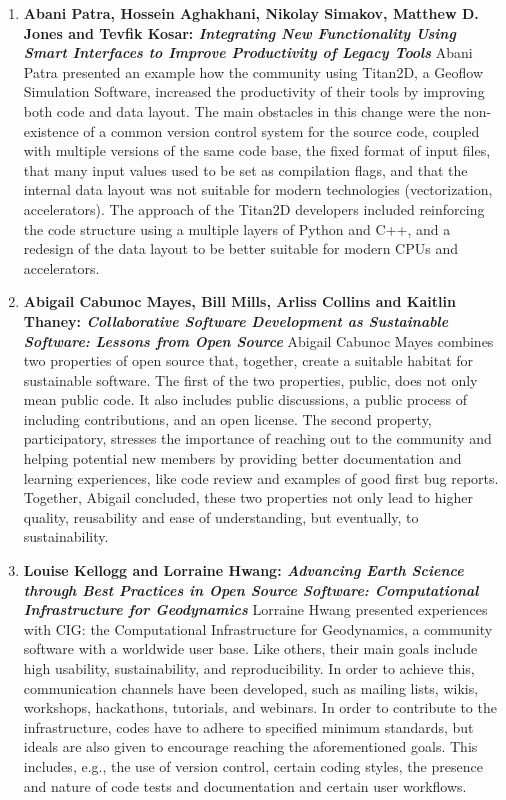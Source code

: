\documentclass[11pt, oneside]{amsart}
\begin{document}
\begin{enumerate}
\item \textbf{Abani Patra, Hossein Aghakhani, Nikolay Simakov, Matthew D. Jones
and Tevfik Kosar: \textit{Integrating New Functionality Using Smart Interfaces
to Improve Productivity of Legacy Tools}} Abani Patra presented an example how
the community using Titan2D, a Geoflow Simulation Software, increased the
productivity of their tools by improving both code and data layout. The main
obstacles in this change were the non-existence of a common version control
system for the source code, coupled with multiple versions of the same code
base, the fixed format of input files, that many input values used to be set as
compilation flags, and that the internal data layout was not suitable for modern
technologies (vectorization, accelerators). The approach of the Titan2D
developers included reinforcing the code structure using a multiple layers of
Python and C++, and a redesign of the data layout to be better suitable for
modern CPUs and accelerators.

\item \textbf{Abigail Cabunoc Mayes, Bill Mills, Arliss Collins and Kaitlin
Thaney: \textit{Collaborative Software Development as Sustainable Software: Lessons
from Open Source}}
Abigail Cabunoc Mayes combines two properties of open source that, together,
create a suitable habitat for sustainable software. The first of the two
properties, public, does not only mean public code. It also includes
public discussions, a public process of including contributions, and an open
license. The second property, participatory, stresses the importance of
reaching out to the community and helping potential new members by providing
better documentation and learning experiences, like code review and examples of
good first bug reports. Together, Abigail concluded, these two properties not
only lead to higher quality, reusability and ease of understanding, but
eventually, to sustainability.

\item \textbf{Louise Kellogg and Lorraine Hwang: \textit{Advancing Earth Science
through Best Practices in Open Source Software: Computational Infrastructure for
Geodynamics}} Lorraine Hwang presented experiences with CIG: the Computational
Infrastructure for Geodynamics, a community software with a worldwide user base.
Like others, their main goals include high usability, sustainability, and
reproducibility. In order to achieve this, communication channels have been
developed, such as mailing lists, wikis, workshops, hackathons, tutorials, and
webinars. In order to contribute to the infrastructure, codes have to adhere to
specified minimum standards, but ideals are also given to encourage reaching the
aforementioned goals. This includes, e.g., the use of version control, certain
coding styles, the presence and nature of code tests and documentation and
certain user workflows.


\end{enumerate}
\end{document}
